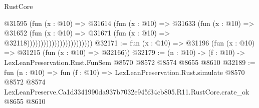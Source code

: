 \begin{lexlean}{RustCore}
\begin{coremodule}
                                        @31595
                                          (fun (x : @10) =>
                                          @31614
                                            (fun (x : @10) =>
                                            @31633
                                              (fun (x : @10) =>
                                              @31652
                                                (fun (x : @10) =>
                                                @31671
                                                  (fun (x : @10) => @32118))))))))))))))))))))))))
@32171 := fun (x : @10) => @31196 (fun (x : @10) => @31215 (fun (x : @10) => @32166))
@32179 := (n : @10) -> (f : @10) -> LexLeanPreservation.Rust.FunSem @8570 @8572 @8574 @8655 @8610
@32189 := fun (n : @10) =>
  fun (f : @10) =>
  LexLeanPreservation.Rust.simulate
    @8570
    @8572
    @8574
    LexLeanPreserve.Ca1d3341990da937b7032e945f34cb805.R11.RustCore.crate_ok
    @8655
    @8610
\end{coremodule}
\end{lexlean}
